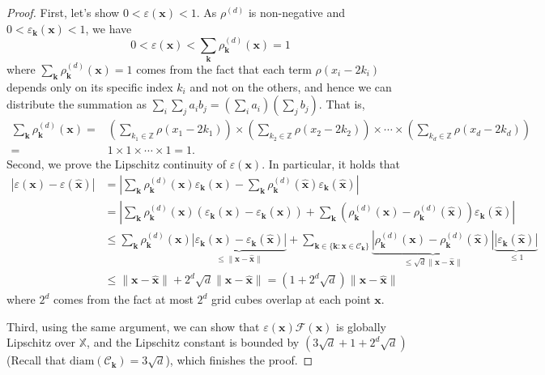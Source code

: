 \documentclass{amsart} %
\def\vk{{\bm{k}}}
\def\vx{{\bm{x}}}
\def\sX{{\mathbb{X}}}
\def\cC{{\mathcal{C}}}
\def\cF{{\mathcal{F}}}
\theoremstyle{definition}
\theoremstyle{remark}
\begin{document}
\begin{proof}
First, let's show $0<\varepsilon(\vx)<1$. As $\rho^{(d)}$ is non-negative and $0<\varepsilon_\vk(\vx)<1$, we have
\[ 0 < \varepsilon(\vx) < \sum_{\vk} \rho^{(d)}_\vk(\vx) = 1 \]
where $\sum_{\vk} \rho^{(d)}_\vk(\vx) = 1$ comes from the fact that each term $\rho(x_i - 2k_i)$ depends only on its specific index $k_i$ and not on the others, and hence we can distribute the summation as $\sum_i \sum_j a_i b_j = (\sum_i a_i)(\sum_j b_j)$. That is,
\[
\begin{aligned}
\sum_{\mathbf{k}} \rho^{(d)}_\mathbf{k}(\vx) 
= & \left( \sum_{k_1 \in \mathbb{Z}} \rho(x_1 - 2k_1) \right) \times \left( \sum_{k_2 \in \mathbb{Z}} \rho(x_2 - 2k_2) \right) \times \cdots \times \left( \sum_{k_d \in \mathbb{Z}} \rho(x_d - 2k_d) \right) \\
= & 1 \times 1 \times \cdots \times 1 = 1.
\end{aligned}
\]
Second, we prove the Lipschitz continuity of $\varepsilon(\vx)$. In particular, it holds that
$$\begin{aligned}
|\varepsilon(\vx) - \varepsilon(\hat{\vx})| 
&= \left| \sum_{\mathbf{k}} \rho^{(d)}_\mathbf{k}(\vx)\varepsilon_\mathbf{k}(\vx) - \sum_{\mathbf{k}} \rho^{(d)}_\mathbf{k}(\hat{\vx})\varepsilon_\mathbf{k}(\hat{\vx}) \right| \\
&= \left| \sum_{\mathbf{k}} \rho^{(d)}_\mathbf{k}(\vx)(\varepsilon_\mathbf{k}(\vx) - \varepsilon_\mathbf{k}(\hat{\vx})) + \sum_{\mathbf{k}} (\rho^{(d)}_\mathbf{k}(\vx) - \rho^{(d)}_\mathbf{k}(\hat{\vx}))\varepsilon_\mathbf{k}(\hat{\vx}) \right| \\
&\le \sum_{\mathbf{k}} \rho^{(d)}_\mathbf{k}(\vx) \underbrace{|\varepsilon_\mathbf{k}(\vx) - \varepsilon_\mathbf{k}(\hat{\vx})|}_{\le \|\vx-\hat{\vx}\|} + \sum_{\vk\in\{\vk:\vx\in\cC_\vk\}} \underbrace{|\rho^{(d)}_\mathbf{k}(\vx) - \rho^{(d)}_\mathbf{k}(\hat{\vx})|}_{\le \sqrt{d}\|\vx-\hat{\vx}\|} \underbrace{|\varepsilon_\mathbf{k}(\hat{\vx})|}_{\le 1}\\
&\leq \|\vx-\hat{\vx}\| + 2^d \sqrt{d} \|\vx-\hat{\vx}\| = (1+2^d \sqrt{d}) \|\vx-\hat{\vx}\|
\end{aligned}$$
where $2^d$ comes from the fact at most $2^d$ grid cubes overlap at each point $\mathbf{x}$.

Third, using the same argument, we can show that $\varepsilon(\vx)\cF(\vx)$ is globally Lipschitz over $\sX$, and the Lipschitz constant is bounded by $\left(3\sqrt{d} + 1 + 2^d \sqrt{d}\right)$ (Recall that $\mathrm{diam}(\cC_\vk) = 3\sqrt{d}$), which finishes the proof.
\end{proof}
\end{document}
